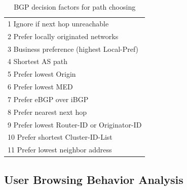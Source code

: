 \documentclass[conference]{IEEEtran}
\begin{document}
\begin{table}[htbp]
	\caption{BGP decision factors for path choosing}
	\centering
	\begin{tabular}{l}		
	\toprule
	1 Ignore if next hop unreachable\\
	2 Prefer locally originated networks\\
	3 Business preference (highest Local-Pref)\\
	4 Shortest AS path\\
	5 Prefer lowest Origin\\
	6 Prefer lowest MED\\
	7 Prefer eBGP over iBGP\\
	8 Prefer nearest next hop\\
	9 Prefer lowest Router-ID or Originator-ID\\
	10 Prefer shortest Cluster-ID-List\\
	11 Prefer lowest neighbor address\\
	\bottomrule
	\end{tabular}

\end{table}
\subsection{User Browsing Behavior Analysis}
\end{document}
